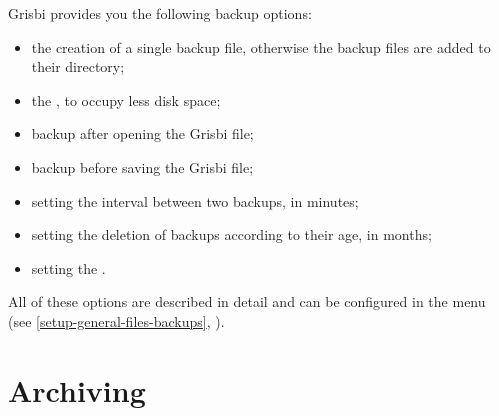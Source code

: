 
Grisbi provides you the following backup options:

\begin{itemize}
	\item the creation of a single backup file, otherwise the backup files are added to their directory;
	\item the , to occupy less disk space;
	\item backup after opening the Grisbi file;
	\item backup before saving the Grisbi file;
	\item setting the interval between two backups, in minutes;
	\item setting the deletion of backups according to their age, in months;
	\item setting the .
\end{itemize}

All of these options are described in detail and can be configured in the  menu (see \vref{setup-general-files-backups}, ).


\section{Archiving\label{datamanagement-archive}}

